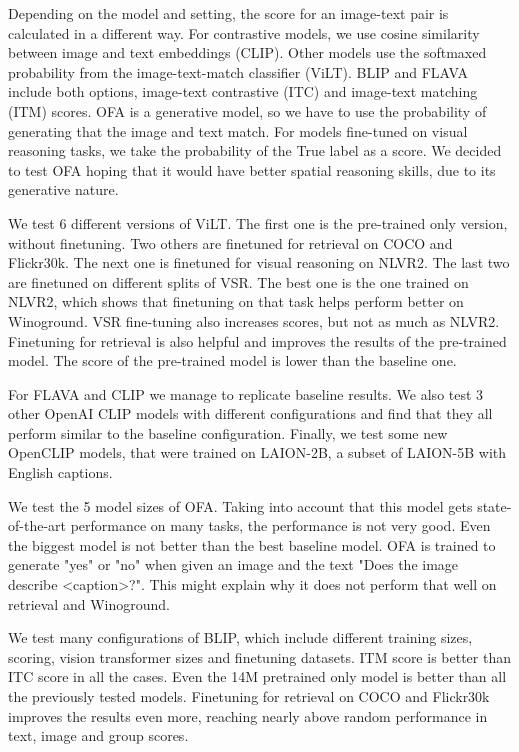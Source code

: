 Depending on the model and setting, the score for an image-text pair is calculated in a different way. For contrastive models, we use cosine similarity between image and text embeddings (CLIP). Other models use the softmaxed probability from the image-text-match classifier (ViLT). BLIP and FLAVA include both options, image-text contrastive (ITC) and image-text matching (ITM) scores. OFA is a generative model, so we have to use the probability of generating that the image and text match. For models fine-tuned on visual reasoning tasks, we take the probability of the True label as a score. We decided to test OFA hoping that it would have better spatial reasoning skills, due to its generative nature.

We test 6 different versions of ViLT. The first one is the pre-trained only version, without finetuning. Two others are finetuned for retrieval on COCO and Flickr30k. The next one is finetuned for visual reasoning on NLVR2. The last two are finetuned on different splits of VSR. The best one is the one trained on NLVR2, which shows that finetuning on that task helps perform better on Winoground. VSR fine-tuning also increases scores, but not as much as NLVR2. Finetuning for retrieval is also helpful and improves the results of the pre-trained model. The score of the pre-trained model is lower than the baseline one.

For FLAVA and CLIP we manage to replicate baseline results. We also test 3 other OpenAI CLIP \cite{radford2021clip} models with different configurations and find that they all perform similar to the baseline configuration. Finally, we test some new OpenCLIP \cite{ilharco_gabriel_2021_5143773} models, that were trained on LAION-2B, a subset of LAION-5B \cite{schuhmann2022laionb} with English captions.

We test the 5 model sizes of OFA. Taking into account that this model gets state-of-the-art performance on many tasks, the performance is not very good. Even the biggest model is not better than the best baseline model. OFA is trained to generate "yes" or "no" when given an image and the text "Does the image describe <caption>?". This might explain why it does not perform that well on retrieval and Winoground.

We test many configurations of BLIP, which include different training sizes, scoring, vision transformer sizes and finetuning datasets. ITM score is better than ITC score in all the cases. Even the 14M pretrained only model is better than all the previously tested models. Finetuning for retrieval on COCO and Flickr30k improves the results even more, reaching nearly above random performance in text, image and group scores.

